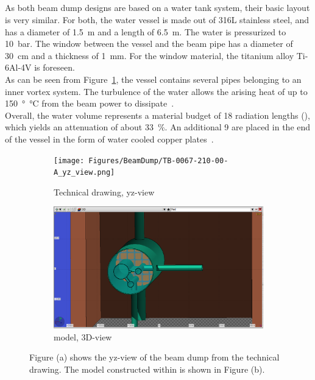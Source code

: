 \subsection{\designone}
\label{BeamDumps:design:design1}
As both beam dump designs are based on a water tank system, their basic layout is very similar.
For both, the water vessel is made out of 316L stainless steel, and has a diameter of \SI{1.5}{\meter} and a length of \SI{6.5}{\meter}.
The water is pressurized to \SI{10}{\bar}.
The window between the vessel and the beam pipe has a diameter of \SI{30}{\centi\meter} and a thickness of \SI{1}{\milli\meter}.
For the window material, the titanium alloy Ti-6Al-4V is foreseen.
\\As can be seen from Figure~\ref{fig:BeamDumps:design1}, the vessel contains several pipes belonging to an inner vortex system.
The turbulence of the water allows the arising heat of up to \SI{150}{\degree\celsius} from the beam power to dissipate~\cite[p. 3]{Dump_report}.
\\Overall, the water volume represents a material budget of 18 radiation lengths (\si{\xzero}), which yields an attenuation of about \SI{33}{\percent}.
An additional \SI{9}{\xzero} are placed in the end of the vessel in the form of water cooled copper plates~\cite[p. 2]{Dump_report}.

\begin{figure}[h]
 \centering
  \begin{subfigure}[b]{0.49\textwidth}
   \centering
    \texttt{[image: Figures/BeamDump/TB-0067-210-00-A\_yz\_view.png]}
   \caption{Technical drawing, yz-view}
   \end{subfigure}
   \hfill
    \begin{subfigure}[b]{0.49\textwidth}
   \centering
    \includegraphics[width=\textwidth]{Figures/BeamDump/Design1_geometry_3Dinside.png}
   \caption{\fluka model, 3D-view}
   \end{subfigure}
   \caption[ILC main beam dump design 1]{Figure (a) shows the yz-view of the beam dump \designone from the technical drawing.
   The \fluka model constructed within \flair is shown in Figure (b).}
   \label{fig:BeamDumps:design1}
 \end{figure}

